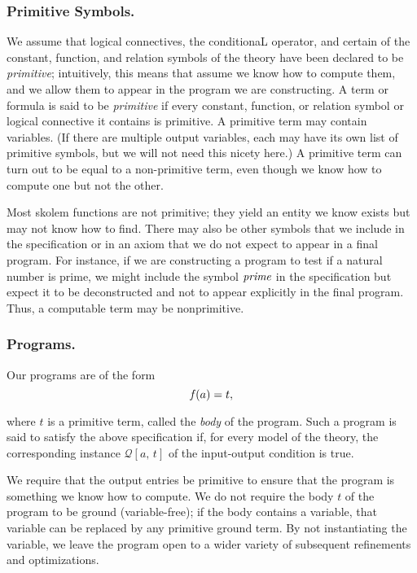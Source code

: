 \documentclass[runningheads]{llncs}
\DeclareMathOperator{\uf}{\emph{f}\,}
\begin{document}
 \subsubsection{Primitive Symbols.}  We assume that logical connectives, the conditionaL operator, and certain of the constant, function, and relation symbols of the theory have been declared to be \emph{primitive}; intuitively, this means that assume we know how to compute them, and we allow them to appear in the program we are constructing.  A term or formula is said to be \emph{primitive} if every constant, function, or relation symbol or logical connective it contains is primitive.  A primitive term may contain variables. (If there are multiple output variables, each may have its own list of primitive symbols, but we will not need this nicety here.)  A primitive term can turn out to be equal to a non-primitive term, even though we know how to compute one but not the other.

 Most skolem functions are not primitive; they yield an entity we know exists but may not know how to find.   There may also  be other symbols that we include in the specification or in an axiom that we do not expect to appear in a final program.  For instance, if we are constructing a program to test if a natural number is prime, we might include the symbol $\emph{prime}$ in the specification but expect it to be deconstructed and not to appear explicitly in the final program. Thus, a computable term may be nonprimitive.

  
  \subsubsection{Programs.} Our programs are of the form 
  \begin{equation*}
      \uf(a) =  t,
  \end{equation*}
  
  \noindent where $t$ is a primitive term, called the \emph{body} of the program. Such a program is said to satisfy the above specification if, for every model of the theory, the corresponding instance $\mathscr{Q}[a, \, t]$ of the input-output condition is true.


We require that the output entries be primitive to ensure that the program is something we know how to compute. 
We do not require the body $t$ of the program to be ground (variable-free); if the body contains a variable, that variable can be replaced by any primitive ground term. By not instantiating the variable, we leave the program open to a wider variety of subsequent refinements and optimizations.
\end{document}
